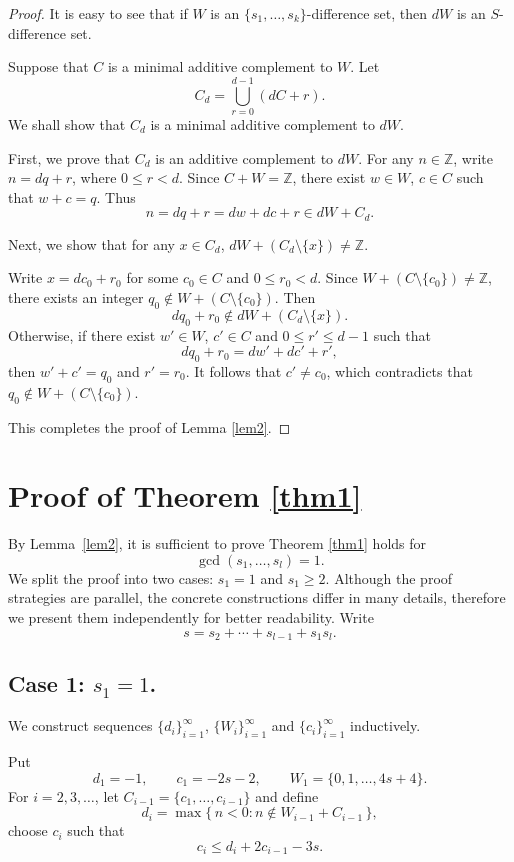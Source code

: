 \documentclass[12pt]{article}
\numberwithin{equation}{section}
\begin{document}
\begin{proof} It is easy to see that if $W$ is an $\{s_1,\ldots,s_k\}$-difference set, then $d W$ is an $S$-difference set.

Suppose that $C$ is a minimal additive complement to $W$.
 Let
$$C_d=\bigcup_{r=0}^{d-1}(dC + r).$$
We shall show that $C_d$ is a minimal additive complement to $d W$.

First, we prove that $C_d$ is an additive complement to $d W$.
For any $n \in \mathbb{Z}$, write $n= dq+r$, where $0 \leq r < d$. Since
$C+W=\mathbb{Z}$, there exist $w \in W$, $c \in C$ such that $w+c=q$.
Thus
$$n=dq+r=dw+dc+r\in d W+C_d.$$

Next, we show that for any $x \in C_d$, $d W+(C_d\setminus\{x\})\neq \mathbb{Z}.$

Write $x=dc_0+r_0$ for some $c_0 \in C$ and $0 \leq r_0 < d$. Since
$W+(C\setminus\{c_0\})\neq \mathbb{Z}$, there exists an integer $q_0\notin W+(C\setminus\{c_0\})$.
Then $$dq_0+r_0\notin d W+(C_d\setminus\{x\}).$$
Otherwise, if there exist $w'\in W$, $c'\in C$ and $0\leqslant r'\leqslant d-1$ such that $$dq_0+r_0=dw'+dc'+r',$$
then $w'+c'=q_0$ and $r'=r_0.$
It follows that $c'\neq c_0$, which contradicts that $q_0\notin W+(C\setminus\{c_0\})$.

  This completes the proof of Lemma \ref{lem2}.
\end{proof}

\section{Proof of Theorem \ref{thm1}}
By Lemma~\ref{lem2}, it is sufficient to prove Theorem \ref{thm1} holds for$$\gcd(s_1,\ldots,s_l)=1.$$
We split the proof into two cases: $s_1=1$ and $s_1\geqslant 2$.
Although the proof strategies are parallel, the concrete constructions differ in many details,
therefore we present them independently for better readability.
Write $$s=s_2+\cdots+s_{l-1}+s_1s_l.$$
\subsection{Case 1: $s_1=1$.}
 We construct sequences $\{d_i\}_{i=1}^\infty$,
$\{W_i\}_{i=1}^\infty$ and $\{c_i\}_{i=1}^\infty$ inductively.

 Put
$$d_1 = -1,\qquad c_1 = -2s-2,\qquad W_1 = \{0,1,\dots,4s+4\}.$$
 For $i=2,3,\ldots$, let $C_{i-1}=\{c_1,\dots,c_{i-1}\}$ and define
$$d_i = \max\{\,n<0 : n\notin W_{i-1}+C_{i-1}\,\},$$
choose $c_i$ such that
\begin{equation}\label{eq3.1}c_i\leqslant d_i + 2c_{i-1} - 3s.\end{equation}
\end{document}
